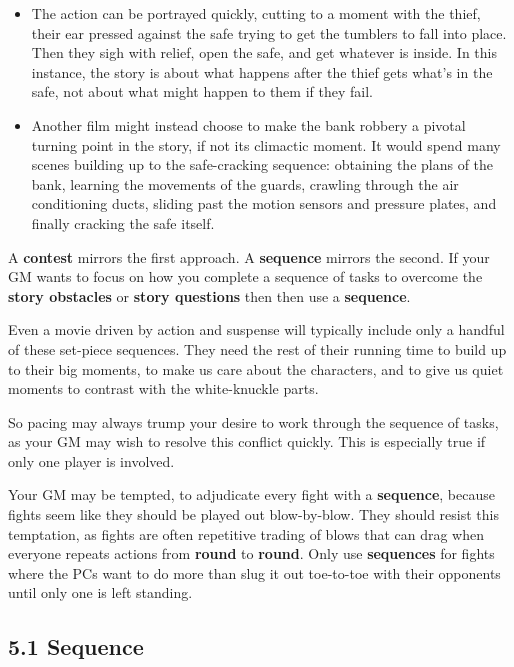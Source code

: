 \documentclass[
  11pt,
]{article}
\providecommand{\tightlist}{%
  \setlength{\itemsep}{0pt}\setlength{\parskip}{0pt}}
\begin{document}
\begin{itemize}
\tightlist
\item
  The action can be portrayed quickly, cutting to a moment with the
  thief, their ear pressed against the safe trying to get the tumblers
  to fall into place. Then they sigh with relief, open the safe, and get
  whatever is inside. In this instance, the story is about what happens
  after the thief gets what's in the safe, not about what might happen
  to them if they fail.
\item
  Another film might instead choose to make the bank robbery a pivotal
  turning point in the story, if not its climactic moment. It would
  spend many scenes building up to the safe-cracking sequence: obtaining
  the plans of the bank, learning the movements of the guards, crawling
  through the air conditioning ducts, sliding past the motion sensors
  and pressure plates, and finally cracking the safe itself.
\end{itemize}

A \textbf{contest} mirrors the first approach. A \textbf{sequence}
mirrors the second. If your GM wants to focus on how you complete a
sequence of tasks to overcome the \textbf{story obstacles} or
\textbf{story questions} then then use a \textbf{sequence}.

Even a movie driven by action and suspense will typically include only a
handful of these set-piece sequences. They need the rest of their
running time to build up to their big moments, to make us care about the
characters, and to give us quiet moments to contrast with the
white-knuckle parts.

So pacing may always trump your desire to work through the sequence of
tasks, as your GM may wish to resolve this conflict quickly. This is
especially true if only one player is involved.

Your GM may be tempted, to adjudicate every fight with a
\textbf{sequence}, because fights seem like they should be played out
blow-by-blow. They should resist this temptation, as fights are often
repetitive trading of blows that can drag when everyone repeats actions
from \textbf{round} to \textbf{round}. Only use \textbf{sequences} for
fights where the PCs want to do more than slug it out toe-to-toe with
their opponents until only one is left standing.

\hypertarget{sequence}{%
\subsection{5.1 Sequence}\label{sequence}}
\end{document}
